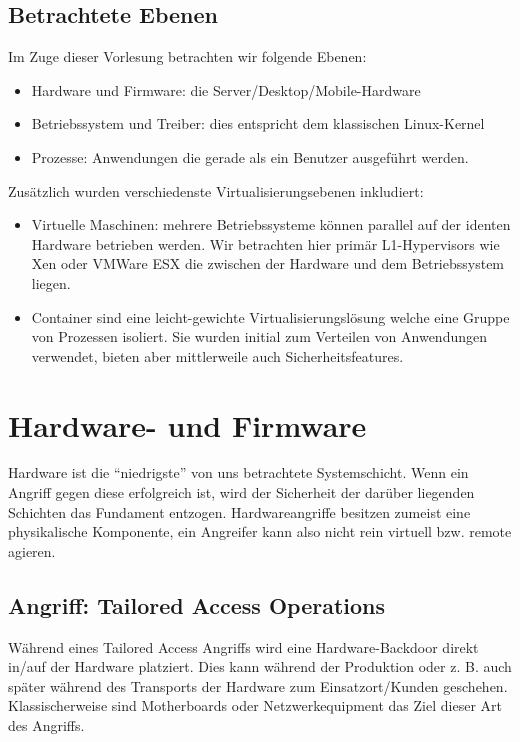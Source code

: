 \section{Betrachtete Ebenen}

Im Zuge dieser Vorlesung betrachten wir folgende Ebenen:

\begin{itemize}
	\item Hardware und Firmware: die Server/Desktop/Mobile-Hardware
	\item Betriebssystem und Treiber: dies entspricht dem klassischen Linux-Kernel
	\item Prozesse: Anwendungen die gerade als ein Benutzer ausgeführt werden.
\end{itemize}

Zusätzlich wurden verschiedenste Virtualisierungsebenen inkludiert:

\begin{itemize}
	\item Virtuelle Maschinen: mehrere Betriebssysteme können parallel auf der identen Hardware betrieben werden. Wir betrachten hier primär L1-Hypervisors wie Xen oder VMWare ESX die zwischen der Hardware und dem Betriebssystem liegen.
	\item Container sind eine leicht-gewichte Virtualisierungslösung welche eine Gruppe von Prozessen isoliert. Sie wurden initial zum Verteilen von Anwendungen verwendet, bieten aber mittlerweile auch Sicherheitsfeatures.
\end{itemize}

\chapter{Hardware- und Firmware}

Hardware ist die ``niedrigste'' von uns betrachtete Systemschicht. Wenn ein Angriff gegen diese erfolgreich ist, wird der Sicherheit der darüber liegenden Schichten das Fundament entzogen. Hardwareangriffe besitzen zumeist eine physikalische Komponente, ein Angreifer kann also nicht rein virtuell bzw. remote agieren.

\section{Angriff: Tailored Access Operations}

Während eines Tailored Access Angriffs wird eine Hardware-Backdoor direkt in/auf der Hardware platziert. Dies kann während der Produktion oder z. B. auch später während des Transports der Hardware zum Einsatzort/Kunden geschehen. Klassischerweise sind Motherboards oder Netzwerkequipment das Ziel dieser Art des Angriffs.

